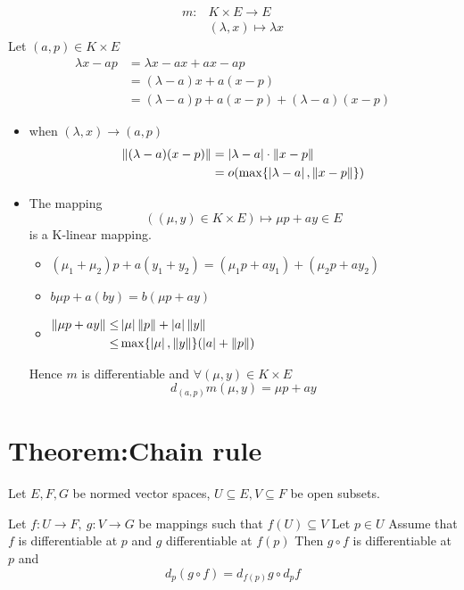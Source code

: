 \documentclass{book}
\newcommand{\abs}[1]{\left\lvert #1 \right\rvert}
\begin{document}
\subsection{}
$$\begin{aligned}
m:&K\times E\rightarrow E\\
&(\lambda,x)\mapsto \lambda x
\end{aligned}$$
Let $(a,p)\in K\times E$
$$\begin{aligned}
    \lambda x-ap &=\lambda x-ax+ax-ap\\
    &=(\lambda-a)x+a(x-p)\\
    &=(\lambda-a)p+a(x-p)+(\lambda-a)(x-p)
\end{aligned}$$
\begin{itemize}
    \item when $(\lambda,x)\rightarrow(a,p)$$$\begin{aligned}
        \norm{(\lambda-a)(x-p)}&=\abs{\lambda-a}\cdot\norm{x-p}\\
        &=o(\max\{\abs{\lambda-a},\norm{x-p}\})
    \end{aligned}$$
    \item The mapping $$((\mu,y)\in K\times E)\mapsto \mu p+ay\in E$$ is a K-linear mapping.
    \begin{itemize}
        \item $(\mu_1+\mu_2)p+a(y_1+y_2)=(\mu_1p+ay_1)+(\mu_2p+ay_2)$
        \item $b\mu p+a(by)=b(\mu p +ay)$
        \item $\begin{aligned}
        \norm{\mu p+ay}\leq &\abs{\mu}\norm{p}+\abs{a}\norm{y}\\
         \leq& \max\{\abs{\mu},\norm{y}\}(\abs{a}+\norm{p})
    \end{aligned}$
    \end{itemize}
    Hence $m$ is differentiable and $\forall (\mu,y)\in K\times E$
    $$d_{(a,p)}m(\mu,y)=\mu p+ay$$
\end{itemize}
\section{Theorem:Chain rule}
Let $E,F,G$ be normed vector spaces, $U\subseteq E,V\subseteq F$ be open subsets. 

Let $f :U\rightarrow F,\ g:V\rightarrow G$ be mappings such that $f(U)\subseteq V$ Let $p\in U$ Assume that $f$ is differentiable at $p$ and $g$ differentiable at $f(p)$ Then $g\circ f$ is differentiable at $p$ and $$d_p(g\circ f)=d_{f(p)}g\circ d_pf$$
\end{document}
